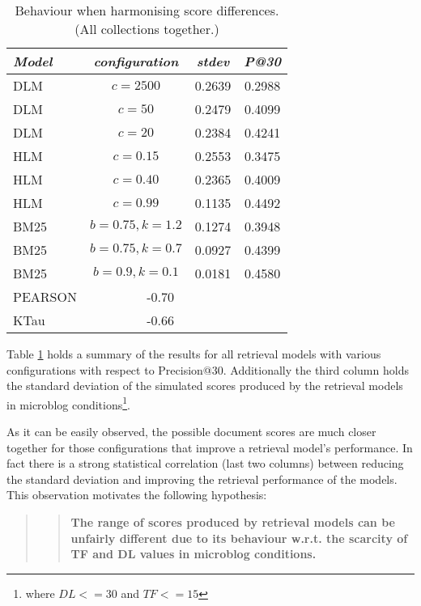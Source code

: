 \begin{table}[]
	\caption{Behaviour when harmonising score differences.(All collections together.)}
	\centering
	\begin{tabular}{l|c|c|c} 	
		\textit{\textbf{Model}} & 
		\textit{\textbf{configuration}} & 
		\textit{\textbf{stdev}} & 
		\textit{\textbf{P@30}} 	
		\tabularnewline
		\hline
		DLM & \(c=2500\) & 0.2639 & 0.2988 \\
		DLM & \(c=50\) & 0.2479 & 0.4099 \\
		DLM & \(c=20\) & 0.2384 & 0.4241 \\
		\hline	
		HLM & \(c=0.15\) & 0.2553 & 0.3475\\
		HLM & \(c=0.40\) & 0.2365 & 0.4009\\
		HLM & \(c=0.99\) & 0.1135 & 0.4492\\
		\hline
		BM25 & \(b=0.75, k=1.2\) & 0.1274 & 0.3948\\
		BM25 & \(b=0.75, k=0.7\) & 0.0927 & 0.4399\\
		BM25 & \(b=0.9, k=0.1\) & 0.0181 & 0.4580\\
		\hline
		\hline    
		PEARSON & \multicolumn{2}{|c}{-0.70}    \\ %
		KTau & \multicolumn{2}{|c}{-0.66}    \\ %
	\end{tabular}
	\label{stdevharmonising}
\end{table}

Table \ref{stdevharmonising} holds a summary of the results for all retrieval models with various configurations with respect to Precision@30. Additionally the third column holds the standard deviation of the simulated scores produced by the retrieval models in microblog conditions\footnote{where $DL<=30$ and $TF<=15$}. 

As it can be easily observed, the possible document scores are much closer together for those configurations that improve a retrieval model's performance. In fact there is a strong statistical correlation (last two columns) between reducing the standard deviation and improving the retrieval performance of the models. This observation motivates the following hypothesis:

\begin{quotation}
\begin{quote}
\textbf{The range of scores produced by retrieval models can be unfairly different due to its behaviour w.r.t. the scarcity of TF and DL values in microblog conditions.}
\end{quote}
\end{quotation}


